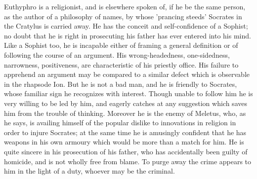 \documentclass[11pt,letter]{article}
\begin{document}
\par  Euthyphro is a religionist, and is elsewhere spoken of, if he be the same person, as the author of a philosophy of names, by whose 'prancing steeds' Socrates in the Cratylus is carried away. He has the conceit and self-confidence of a Sophist; no doubt that he is right in prosecuting his father has ever entered into his mind. Like a Sophist too, he is incapable either of framing a general definition or of following the course of an argument. His wrong-headedness, one-sidedness, narrowness, positiveness, are characteristic of his priestly office. His failure to apprehend an argument may be compared to a similar defect which is observable in the rhapsode Ion. But he is not a bad man, and he is friendly to Socrates, whose familiar sign he recognizes with interest. Though unable to follow him he is very willing to be led by him, and eagerly catches at any suggestion which saves him from the trouble of thinking. Moreover he is the enemy of Meletus, who, as he says, is availing himself of the popular dislike to innovations in religion in order to injure Socrates; at the same time he is amusingly confident that he has weapons in his own armoury which would be more than a match for him. He is quite sincere in his prosecution of his father, who has accidentally been guilty of homicide, and is not wholly free from blame. To purge away the crime appears to him in the light of a duty, whoever may be the criminal.
\end{document}
